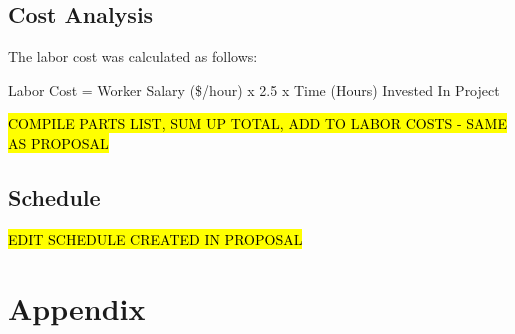\documentclass[letterpaper,10pt]{article}
\begin{document}
\begin{spacing}{1.15}
\subsection{Cost Analysis}
The labor cost was calculated as follows:

\begin{center}
	Labor Cost = Worker Salary (\$/hour) x 2.5 x Time (Hours) Invested In Project
\end{center}

\hl{COMPILE PARTS LIST, SUM UP TOTAL, ADD TO LABOR COSTS - SAME AS PROPOSAL}

\subsection{Schedule}
\hl{EDIT SCHEDULE CREATED IN PROPOSAL}


\clearpage


\section*{Appendix}


\end{spacing}
\end{document}
